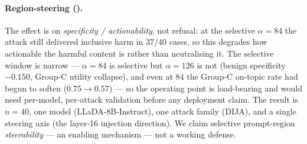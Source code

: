 \paragraph{Region-steering ().} The effect is on
\emph{specificity / actionability}, not refusal: at the selective $\alpha{=}84$ the attack
still delivered inclusive harm in 37/40 cases, so this degrades how actionable the harmful
content is rather than neutralising it. The selective window is narrow --- $\alpha{=}84$
is selective but $\alpha{=}126$ is not (benign specificity $-0.150$, Group-C utility
collapse), and even at $84$ the Group-C on-topic rate had begun to soften
($0.75\to0.57$) --- so the operating point is load-bearing and would need per-model,
per-attack validation before any deployment claim. The result is $n{=}40$, one model
(LLaDA-8B-Instruct), one attack family (DIJA), and a single steering axis (the layer-16
injection direction). We claim selective prompt-region \emph{steerability} --- an enabling
mechanism --- not a working defense.
